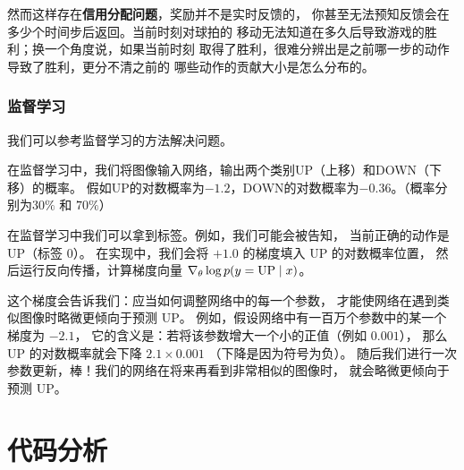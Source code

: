 然而这样存在\textbf{信用分配问题}，奖励并不是实时反馈的，
你甚至无法预知反馈会在多少个时间步后返回。当前时刻对球拍的
移动无法知道在多久后导致游戏的胜利；换一个角度说，如果当前时刻
取得了胜利，很难分辨出是之前哪一步的动作导致了胜利，更分不清之前的
哪些动作的贡献大小是怎么分布的。

\subsubsection{监督学习}

我们可以参考监督学习的方法解决问题。

在监督学习中，我们将图像输入网络，输出两个类别UP（上移）和DOWN（下移）的概率。
假如UP的对数概率为$-1.2$，DOWN的对数概率为$-0.36$。（概率分别为$30\%$ 和 $70\%$）

在监督学习中我们可以拿到标签。例如，我们可能会被告知，
当前正确的动作是 UP（标签 0）。
在实现中，我们会将 $+1.0$ 的梯度填入 UP 的对数概率位置，
然后运行反向传播，计算梯度向量
$\nabla_{\theta}\log p(y=\mathrm{UP}\mid x)$。

这个梯度会告诉我们：应当如何调整网络中的每一个参数，
才能使网络在遇到类似图像时略微更倾向于预测 UP。
例如，假设网络中有一百万个参数中的某一个梯度为 $-2.1$，
它的含义是：若将该参数增大一个小的正值（例如 $0.001$），
那么 UP 的对数概率就会下降 $2.1 \times 0.001$
（下降是因为符号为负）。
随后我们进行一次参数更新，棒！我们的网络在将来再看到非常相似的图像时，
就会略微更倾向于预测 UP。





\section{代码分析}
